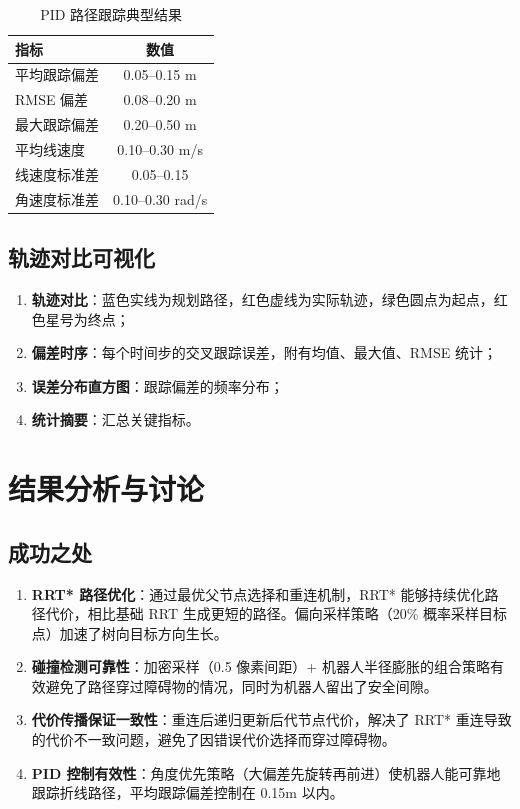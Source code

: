 \documentclass{SYSUReport}
\begin{document}
\begin{table}[H]
    \centering
    \caption{PID 路径跟踪典型结果}
    \begin{tabular}{lc}
        \toprule
        \textbf{指标} & \textbf{数值} \\
        \midrule
        平均跟踪偏差 & 0.05--0.15 m \\
        RMSE 偏差 & 0.08--0.20 m \\
        最大跟踪偏差 & 0.20--0.50 m \\
        平均线速度 & 0.10--0.30 m/s \\
        线速度标准差 & 0.05--0.15 \\
        角速度标准差 & 0.10--0.30 rad/s \\
        \bottomrule
    \end{tabular}
\end{table}

\subsection{轨迹对比可视化}

\begin{enumerate}
    \item \textbf{轨迹对比}：蓝色实线为规划路径，红色虚线为实际轨迹，绿色圆点为起点，红色星号为终点；
    \item \textbf{偏差时序}：每个时间步的交叉跟踪误差，附有均值、最大值、RMSE 统计；
    \item \textbf{误差分布直方图}：跟踪偏差的频率分布；
    \item \textbf{统计摘要}：汇总关键指标。
\end{enumerate}

\section{结果分析与讨论}

\subsection{成功之处}

\begin{enumerate}
    \item \textbf{RRT* 路径优化}：通过最优父节点选择和重连机制，RRT* 能够持续优化路径代价，相比基础 RRT 生成更短的路径。偏向采样策略（20\% 概率采样目标点）加速了树向目标方向生长。
    \item \textbf{碰撞检测可靠性}：加密采样（0.5 像素间距）+ 机器人半径膨胀的组合策略有效避免了路径穿过障碍物的情况，同时为机器人留出了安全间隙。
    \item \textbf{代价传播保证一致性}：重连后递归更新后代节点代价，解决了 RRT* 重连导致的代价不一致问题，避免了因错误代价选择而穿过障碍物。
    \item \textbf{PID 控制有效性}：角度优先策略（大偏差先旋转再前进）使机器人能可靠地跟踪折线路径，平均跟踪偏差控制在 0.15m 以内。
\end{enumerate}
\end{document}
